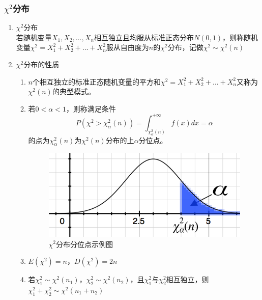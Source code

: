 \subsubsection{$\chi^2$分布}
\begin{enumerate}
	\item $\chi^2$分布 \\
	若随机变量$X_1, X_2, \dots, X_n$相互独立且均服从标准正态分布$N(0,1)$，则称随机变量$\chi^2 = X_1^2+X_2^2+\dots+X_n^2$服从自由度为$n$的$\chi^2$分布，记做$\chi^2 \sim \chi^2(n)$
	\item $\chi^2$分布的性质 \\
	\begin{enumerate}
		\item $n$个相互独立的标准正态随机变量的平方和$\chi^2 = X_1^2+X_2^2+\dots+X_n^2$又称为$\chi^2(n)$的典型模式。
		\item 若$0<\alpha<1$，则称满足条件
		\begin{equation}
			P(\chi^2 > \chi_{\alpha}^{2}(n)) = \int_{\chi_{\alpha}^{2}(n)}^{+\infty}f(x)dx = \alpha
		\end{equation}
		的点为$\chi_{\alpha}^{2}(n)$为$\chi^2(n)$分布的上$\alpha$分位点。
		\begin{figure}[htbp]
			\centering
			\includegraphics[scale=0.9]{images/分位点}
			\caption{$\chi^2$分布分位点示例图}
		\end{figure}
		\item $E(\chi^2) = n$，$D(\chi^2)=2n$
		\item 若$\chi_1^2 \sim \chi^2(n_1)$，$\chi_2^2 \sim \chi^2(n_2)$，且$\chi_1^2$与$\chi_2^2$相互独立，则$\chi_1^2 + \chi_2^2 \sim \chi^2(n_1+n_2)$
	\end{enumerate}
\end{enumerate}

